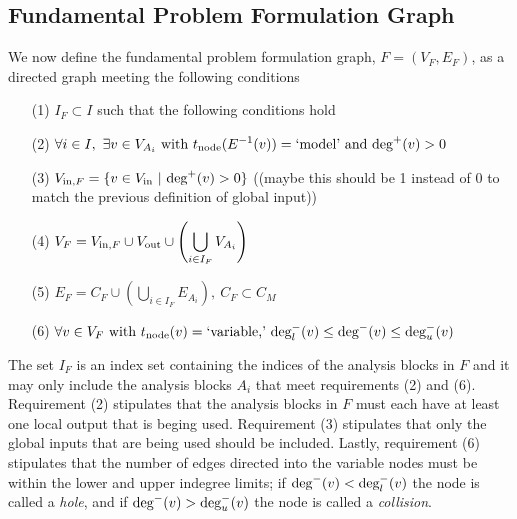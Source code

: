 \subsection{Fundamental Problem Formulation Graph}
We now define the fundamental problem formulation graph, $F=(V_F,E_F)$, as a directed graph meeting the following conditions
\begin{enumerate}
\item[(1)] $\displaystyle{I_F \subset I}$ such that the following conditions hold
\item[(2)] $\displaystyle{ \forall i \in I, \ \exists v \in V_{A_i} \textrm{ with } t_\textrm{node}(E^{-1}(v))=\textrm{`model'} \textrm{ and } \textrm{deg}^+(v)>0 }$
\item[(3)] $\displaystyle{V_{\textrm{in},F} = \{v \in V_\textrm{in}  \ | \ \textrm{deg}^+(v) > 0\} }$ ((maybe this should be 1 instead of 0 to match the previous definition of global input))
\item[(4)] $\displaystyle{V_F = V_{\textrm{in},F} \cup V_\textrm{out} \cup \left( \bigcup_{i \in I_F} V_{A_i} \right)}$
\item[(5)] $\displaystyle{E_F = C_F \cup \left( \bigcup_{i \in I_F} E_{A_i} \right), \ C_F \subset C_M}$
\item[(6)] $\displaystyle{\forall v \in V_F \textrm{ with } t_\textrm{node}(v) = \textrm{`variable,'} \  \textrm{deg}_l^-(v) \leq \textrm{deg}^-(v) \leq \textrm{deg}_u^-(v)}$
\end{enumerate}
The set $I_F$ is an index set containing the indices of the analysis blocks in $F$ and it may only include the analysis blocks $A_i$ that meet requirements (2) and (6). Requirement (2) stipulates that the analysis blocks in $F$ must each have at least one local output that is beging used. Requirement (3) stipulates that only the global inputs that are being used should be included. Lastly, requirement (6) stipulates that the number of edges directed into the variable nodes must be within the lower and upper indegree limits; if $\textrm{deg}^-(v) < \textrm{deg}_l^-(v)$ the node is called a \emph{hole}, and if $\textrm{deg}^-(v) > \textrm{deg}_u^-(v)$ the node is called a \emph{collision}. 

